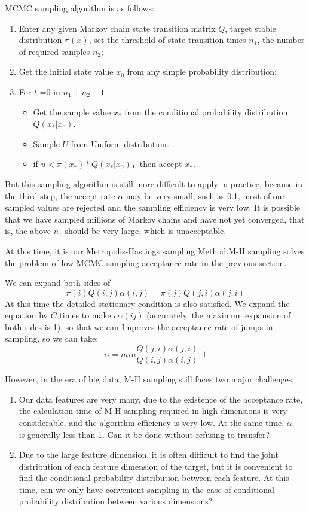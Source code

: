 MCMC sampling algorithm is as follows:
\begin{enumerate}
  \item Enter any given Markov chain state transition matrix $Q$, target stable distribution $\pi(x)$, set the threshold of state transition times $n_1$, the number of required samples $n_2$;
  \item Get the initial state value $x_0$ from any simple probability distribution;
  \item For $t$ =0 in $n_1+n_2-1$
    \begin{itemize}
      \item Get the sample value $x_*$ from the conditional probability distribution $Q(x_*|x_0)$.
      \item Sample $U$ from Uniform distribution.
      \item if $u<\pi(x_*)*Q(x_*|x_0)$，then accept $x_*$.
    \end{itemize}
\end{enumerate}


But this sampling algorithm is still more difficult to apply in practice, because in the third step, the accept rate $\alpha$ may be very small, such as 0.1, most of our sampled values ​​are rejected and the sampling efficiency is very low. It is possible that we have sampled millions of Markov chains and have not yet converged, that is, the above $n_1$ should be  very large, which is unacceptable.

At this time, it is our Metropolis-Hastings sampling Method.M-H sampling solves the problem of low MCMC sampling acceptance rate in the previous section.

We can expand both sides of
\[
  \pi(i)Q(i,j)\alpha(i,j) =  \pi(j)Q(j,i)\alpha(j,i)
\]
At this time the detailed stationary condition is also satisfied. We expand the equation by $C$ times to make $c\alpha(ij)$ (accurately, the maximum expansion of both sides is 1), so that we can Improves the acceptance rate of jumps in sampling, so we can take:
\[
  \alpha = min{\frac{Q(j,i)\alpha(j,i)}{Q(i,j)\alpha(i,j)},1}
\]

However, in the era of big data, M-H sampling still faces two major challenges:
\begin{enumerate}

  \item Our data features are very many, due to the existence of the acceptance rate, the calculation time of M-H sampling required in high dimensions is very considerable, and the algorithm efficiency is very low. At the same time, $\alpha$　is generally less than 1.  Can it be done without refusing to transfer?

  \item Due to the large feature dimension, it is often difficult to find the joint distribution of each feature dimension of the target, but it is convenient to find the conditional probability distribution between each feature. At this time, can we only have convenient sampling in the case of conditional probability distribution between various dimensions?
\end{enumerate}

